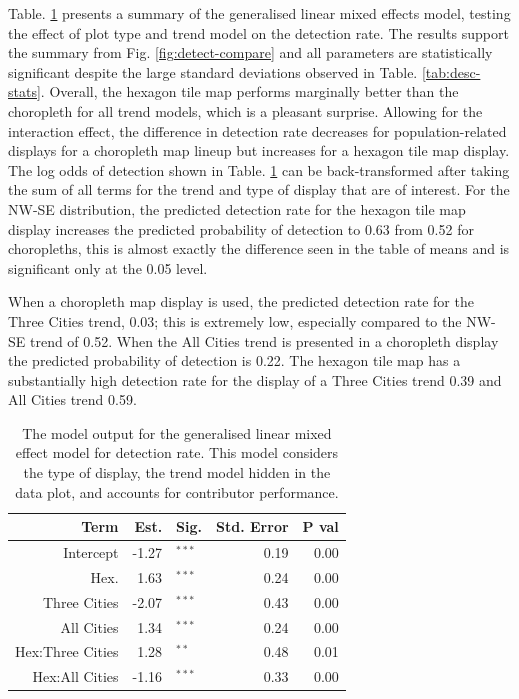\documentclass[times, doublespace]{anzsauth}
\begin{document}
Table. \ref{tab:detect-glmer1} presents a summary of the generalised
linear mixed effects model, testing the effect of plot type and trend
model on the detection rate. The results support the summary from Fig.
\ref{fig:detect-compare} and all parameters are statistically
significant despite the large standard deviations observed in Table.
\ref{tab:desc-stats}. Overall, the hexagon tile map performs marginally
better than the choropleth for all trend models, which is a pleasant
surprise. Allowing for the interaction effect, the difference in
detection rate decreases for population-related displays for a
choropleth map lineup but increases for a hexagon tile map display. The
log odds of detection shown in Table. \ref{tab:detect-glmer1} can be back-transformed after taking the sum of all terms for the trend and type of
display that are of interest. For the NW-SE distribution, the predicted
detection rate for the hexagon tile map display increases the predicted
probability of detection to 0.63 from 0.52 for choropleths, this is
almost exactly the difference seen in the table of means and is
significant only at the 0.05 level.

When a choropleth map display is used, the predicted detection rate for
the Three Cities trend, 0.03; this is extremely low, especially compared
to the NW-SE trend of 0.52. When the All Cities trend is presented in a
choropleth display the predicted probability of detection is 0.22. The
hexagon tile map has a substantially high detection rate for the display
of a Three Cities trend 0.39 and All Cities trend 0.59.

\begin{table}

\caption{\label{tab:detect-glmer1}The model output for the generalised linear mixed effect model for detection rate. This model considers the type of display, the trend model hidden in the data plot, and accounts for contributor performance.}
\centering
\begin{tabular}[t]{rrlrr}
\toprule
Term & Est. & Sig. & Std. Error & P val\\
\midrule
Intercept & -1.27 & $^{***}$ & 0.19 & 0.00\\
Hex. & 1.63 & $^{***}$ & 0.24 & 0.00\\
\addlinespace
Three Cities & -2.07 & $^{***}$ & 0.43 & 0.00\\
All Cities & 1.34 & $^{***}$ & 0.24 & 0.00\\
\addlinespace
Hex:Three Cities & 1.28 & $^{**}$ & 0.48 & 0.01\\
Hex:All Cities & -1.16 & $^{***}$ & 0.33 & 0.00\\
\bottomrule
\end{tabular}
\end{table}
\end{document}
